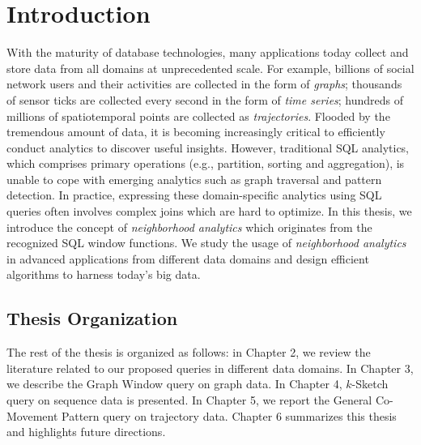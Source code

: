 \chapter{Introduction}
With the maturity of database technologies, many applications today collect and store data from all domains 
at unprecedented scale. For example, billions of 
social network users and their activities are collected in the form
of \emph{graphs}; 
thousands of sensor ticks are collected every second
in the form of \emph{time series}; hundreds of millions of spatiotemporal points
are collected as \emph{trajectories}.
Flooded by the tremendous amount of data, 
it is becoming increasingly critical to efficiently
conduct analytics to discover useful insights.
However, traditional SQL analytics, which comprises 
primary operations (e.g., partition, sorting and aggregation),
is unable to cope with emerging analytics
such as graph traversal and pattern detection. 
In practice, expressing these domain-specific 
analytics using SQL queries often involves 
complex joins which are hard to optimize. 
In this thesis, we introduce the concept of \emph{neighborhood analytics} which
originates from the recognized SQL window functions. We study
the usage of \emph{neighborhood analytics} in advanced applications 
from different data domains
and design efficient algorithms to harness today's big data.

%




 


\section{Thesis Organization}
The rest of the thesis is organized as follows: in Chapter 2, we review the literature related
to our proposed queries in different data domains.
In Chapter 3, we describe the Graph Window query on graph data. 
In Chapter 4, $k$-Sketch query on sequence data is presented.
In Chapter 5, we report the General Co-Movement Pattern query on trajectory data. 
Chapter 6 summarizes this thesis and highlights future directions.

